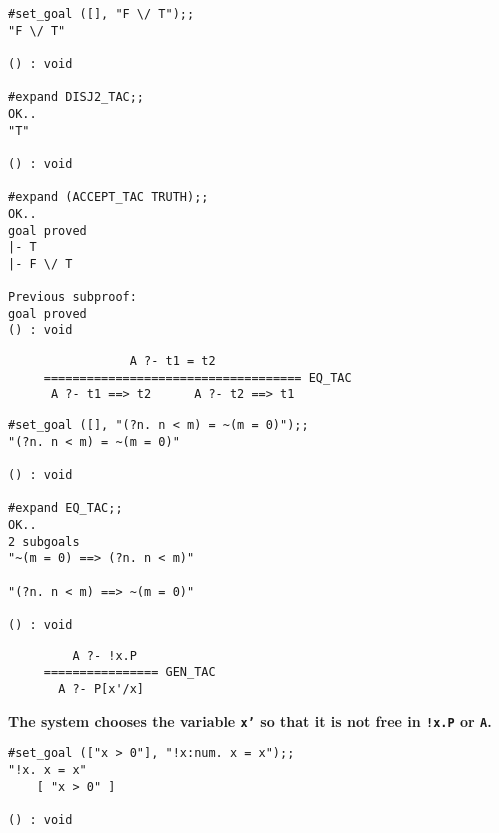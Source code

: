 \vskip 4mm
\begin{session}\begin{verbatim}
#set_goal ([], "F \/ T");;
"F \/ T"

() : void

#expand DISJ2_TAC;;
OK..
"T"

() : void

#expand (ACCEPT_TAC TRUTH);;
OK..
goal proved
|- T
|- F \/ T

Previous subproof:
goal proved
() : void
\end{verbatim}\end{session}



\vskip7mm
{\Large\begin{verbatim}
                 A ?- t1 = t2
     ==================================== EQ_TAC
      A ?- t1 ==> t2      A ?- t2 ==> t1

\end{verbatim}}

\vskip4mm
\begin{session}\begin{verbatim}
#set_goal ([], "(?n. n < m) = ~(m = 0)");;
"(?n. n < m) = ~(m = 0)"

() : void

#expand EQ_TAC;;
OK..
2 subgoals
"~(m = 0) ==> (?n. n < m)"

"(?n. n < m) ==> ~(m = 0)"

() : void
\end{verbatim}\end{session}


\vskip7mm
{\Large\begin{verbatim}
         A ?- !x.P
     ================ GEN_TAC
       A ?- P[x'/x]
\end{verbatim}}\vskip 5mm
\bpindent\LARGE\bf
The system chooses the variable {\tt x'} so that it is not free in \verb+!x.P+
or {\tt A}.  
\epindent

\vskip7mm
\vskip4mm
\begin{session}\begin{verbatim}
#set_goal (["x > 0"], "!x:num. x = x");;
"!x. x = x"
    [ "x > 0" ]

() : void
\end{verbatim}\end{session}

